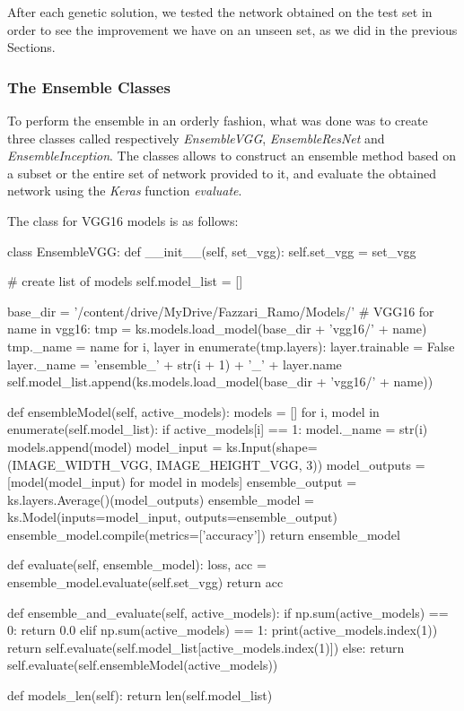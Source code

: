 After each genetic solution, we tested the network obtained on the test set in order to see the improvement we have on an unseen set, as we did in the previous Sections.


\subsubsection{The Ensemble Classes}
To perform the ensemble in an orderly fashion, what was done was to create three classes called respectively \textit{EnsembleVGG}, \textit{EnsembleResNet} and \textit{EnsembleInception}. The classes allows to construct an ensemble method based on a subset or the entire set of network provided to it, and evaluate the obtained network using the \textit{Keras} function \textit{evaluate}.

The class for VGG16 models is as follows:

\begin{python}
class EnsembleVGG:
    def __init__(self, set_vgg):
        self.set_vgg = set_vgg

        # create list of models
        self.model_list = []

        base_dir = '/content/drive/MyDrive/Fazzari_Ramo/Models/'
        # VGG16
        for name in vgg16:
            tmp = ks.models.load_model(base_dir + 'vgg16/' + name)
            tmp._name = name
            for i, layer in enumerate(tmp.layers):
                layer.trainable = False
                layer._name = 'ensemble_' + str(i + 1) + '_' + layer.name
            self.model_list.append(ks.models.load_model(base_dir + 'vgg16/' + name))


    def ensembleModel(self, active_models):
        models = []
        for i, model in enumerate(self.model_list):
            if active_models[i] == 1:
                model._name = str(i)
                models.append(model)
        model_input = ks.Input(shape=(IMAGE_WIDTH_VGG, IMAGE_HEIGHT_VGG, 3))
        model_outputs = [model(model_input) for model in models]
        ensemble_output = ks.layers.Average()(model_outputs)
        ensemble_model = ks.Model(inputs=model_input, outputs=ensemble_output)
        ensemble_model.compile(metrics=['accuracy'])
        return ensemble_model

    def evaluate(self, ensemble_model):
        loss, acc = ensemble_model.evaluate(self.set_vgg)
        return acc

    def ensemble_and_evaluate(self, active_models):
        if np.sum(active_models) == 0:
            return 0.0
        elif np.sum(active_models) == 1:
            print(active_models.index(1))
            return self.evaluate(self.model_list[active_models.index(1)])
        else:
            return self.evaluate(self.ensembleModel(active_models))

    def models_len(self):
        return len(self.model_list)
\end{python}

